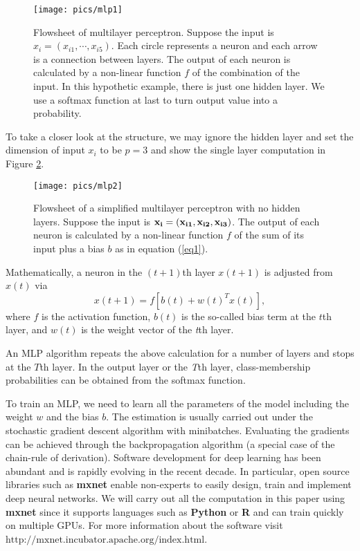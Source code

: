 \documentclass[]{article}
\begin{document}
\begin{figure}[h]
	\centering
	\texttt{[image: pics/mlp1]}
	\caption{Flowsheet of multilayer perceptron. Suppose the input is $ x_i=(x_{i1},\cdots,x_{i5}) $. Each circle represents a neuron and each arrow is a connection between layers. The output of each neuron is calculated by a non-linear function $ f $ of the combination of the input. In this hypothetic example, there is just one hidden layer. We use a softmax function at last to turn output value into a probability.\label{fig:mlp1}}
\end{figure}


To take a closer look at the structure, we may ignore the hidden layer and set the dimension of input $ x_i $ to be $p=3$ and show the single layer computation in Figure \ref{fig:mlp2}.
\begin{figure}[h]
	\centering
	\texttt{[image: pics/mlp2]}
	\caption{Flowsheet of a simplified multilayer perceptron with no hidden layers. Suppose the input is $ \bf{x_i}=(x_{i1},x_{i2},x_{i3}) $. The output of each neuron is calculated by a non-linear function $ f $ of the sum of its input plus a bias $b$ as in equation (\ref{eq1}).\label{fig:mlp2}}
\end{figure}
Mathematically, a neuron in the $ (t+1) $th layer $ x(t+1) $ is adjusted from $x(t)$ via
\begin{equation}\label{eq1}
x(t+1)=f[b(t)+w(t)^Tx(t)],
\end{equation}
where $ f $ is the activation function, $ b(t) $ is the so-called bias term at the $t$th layer, and $ w(t) $ is the weight vector of the \textit{t}th layer.

An MLP algorithm repeats the above calculation for a number of layers and stops at the $T$th layer. In the output layer or the \textit{T}th layer, class-membership probabilities can be obtained from the softmax function. 

To train an MLP, we need to learn all the parameters of the model including the weight $ w $ and the bias $ b $. The estimation is usually carried out under the stochastic gradient descent algorithm with minibatches\cite{bottou2010large}. Evaluating the gradients can be achieved through the backpropagation algorithm\cite{hecht1988theory} (a special case of the chain-rule of derivation). Software development for deep learning has been abundant and is rapidly evolving in the recent decade. In particular, open source libraries such as \textbf{mxnet} enable non-experts to easily design, train and implement deep neural networks. We will carry out all the computation in this paper using \textbf{mxnet} since it supports languages such as \textbf{Python} or \textbf{R} and can train quickly on multiple GPUs. For more information about the software visit $\mbox{http://mxnet.incubator.apache.org/index.html}$. 
\end{document}
